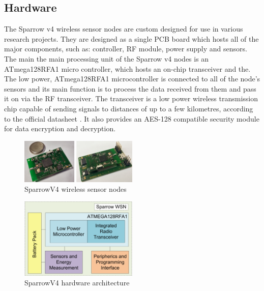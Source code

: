 \subsection{Hardware}

The Sparrow v4 wireless sensor nodes are custom designed for use in various research projects.
They are designed as a single PCB board which hosts all of the major components, such as: controller,
RF module, power supply and sensors. The main the main processing unit of the Sparrow v4 nodes is an ATmega128RFA1 micro controller, 
which hosts an on-chip transceiver \cite{ATmega1281} and the. The low power, ATmega128RFA1 microcontroller is connected to all of the node's sensors and its
main function is to process the data received from them and pass it on via the RF transceiver. The transceiver 
is a low power wireless transmission chip capable of sending signals to distances of up to a few kilometres, according 
to the official datasheet \cite{datasheetatmel}. It also provides an AES-128 compatible security module for data 
encryption and decryption.

\begin{figure}[ht] \centering
  \includegraphics[width=0.5\textwidth]{img/sparrow-v4.png}
  \caption{SparrowV4 wireless sensor nodes}
\end{figure}

\begin{figure}[ht] \centering
  \includegraphics[width=0.5\textwidth]{img/sparrow-v4-arch.png}
  \caption{SparrowV4 hardware architecture}
\end{figure}


